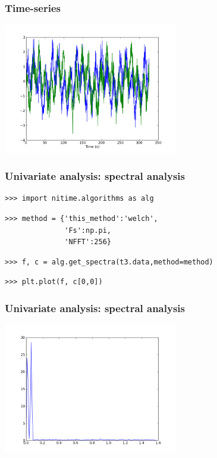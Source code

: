\documentclass{beamer}
\begin{document}
\begin{frame}
\frametitle{Time-series}
\includegraphics[height=5.7cm]{figures/outa_phase_tseries}
\end{frame}

\begin{frame}[fragile]
\frametitle{Univariate analysis: spectral analysis }
\begin{lstlisting}
>>> import nitime.algorithms as alg
\end{lstlisting}
\pause
\begin{lstlisting}
>>> method = {'this_method':'welch',
              'Fs':np.pi,
              'NFFT':256}
\end{lstlisting}
\pause
\begin{lstlisting}
>>> f, c = alg.get_spectra(t3.data,method=method)
\end{lstlisting}
\pause
\begin{lstlisting}
>>> plt.plot(f, c[0,0])
\end{lstlisting}
\end{frame}

\begin{frame}
\frametitle{Univariate analysis: spectral analysis}
\includegraphics[height=5.7cm]{figures/outa_phase_tseries_single_psd}
\end{frame}
\end{document}
